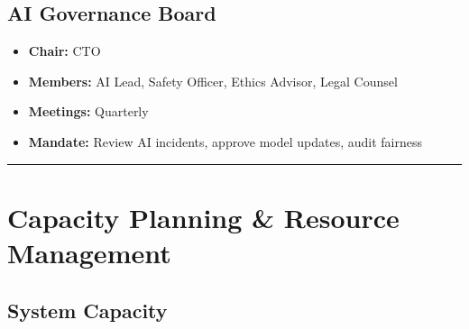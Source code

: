 \documentclass[
]{article}
\providecommand{\tightlist}{%
  \setlength{\itemsep}{0pt}\setlength{\parskip}{0pt}}
\begin{document}
\hypertarget{ai-governance-board}{%
\subsection{AI Governance Board}\label{ai-governance-board}}

\begin{itemize}
\tightlist
\item
  \textbf{Chair:} CTO
\item
  \textbf{Members:} AI Lead, Safety Officer, Ethics Advisor, Legal
  Counsel
\item
  \textbf{Meetings:} Quarterly
\item
  \textbf{Mandate:} Review AI incidents, approve model updates, audit
  fairness
\end{itemize}

\begin{center}\rule{0.5\linewidth}{0.5pt}\end{center}

\hypertarget{capacity-planning-resource-management}{%
\section{Capacity Planning \& Resource
Management}\label{capacity-planning-resource-management}}

\hypertarget{system-capacity}{%
\subsection{System Capacity}\label{system-capacity}}
\end{document}
